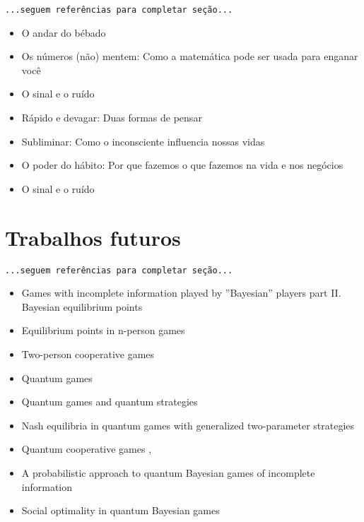 \documentclass[
	article,			        %
	11pt,				          %
	oneside,			        %
	a4paper,			        %
	english,			        %
	brazil,				        %
	sumario=tradicional
]{abntex2}\usepackage[]{graphicx}\usepackage[]{color}
\begin{document}
  \texttt{\color{red}...seguem referências para completar seção...}
  \begin{itemize}
    \item O andar do bébado \cite{Mlodinow.2009}
    \item Os n\'umeros (não) mentem: Como a matemática pode ser usada para enganar você \cite{Seife.2012}
    \item O sinal e o ruído \cite{Nate.2012}
    \item R{á}pido e devagar: Duas formas de pensar \cite{Kahneman.2012}
    \item Subliminar: Como o inconsciente influencia nossas vidas \cite{Mlodinow.2013}
    \item O poder do h{á}bito: Por que fazemos o que fazemos na vida e nos neg{ó}cios \cite{Duhigg.2012}
    \item O sinal e o ruído \cite{Nate.2012}
  \end{itemize}

\section{Trabalhos futuros}
\label{sec:futuro}
  \texttt{\color{red}...seguem referências para completar seção...}
  \begin{itemize}
    \item Games with incomplete information played by ''Bayesian'' players part II. Bayesian equilibrium points \cite{Harsanyi.1968}
    \item Equilibrium points in n-person games \cite{Nash.1950}
    \item Two-person cooperative games \cite{Nash.1953}
    \item Quantum games \cite{JoseFigueiredo.2004}
    \item Quantum games and quantum strategies \cite{Eisert.1999}
    \item Nash equilibria in quantum games with generalized two-parameter strategies \cite{Flitney.2007}
    \item Quantum cooperative games \cite{Iqbal.2002},\cite{Dai.2004}
    \item A probabilistic approach to quantum Bayesian games of incomplete information \cite{Iqbal.2014}
    \item Social optimality in quantum Bayesian games \cite{Azhar.2015}
  \end{itemize}

\postextual





\end{document}
